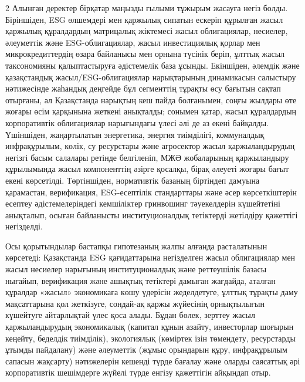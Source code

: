 \begin{multicols}{2}
Алынған деректер бірқатар маңызды ғылыми тұжырым жасауға негіз болды.
Біріншіден, ESG өлшемдері мен қаржылық сипатын ескеріп құрылған жасыл
қаржылық құралдардың матрицалық жіктемесі жасыл облигациялар, несиелер,
әлеуметтік және ESG-облигациялар, жасыл инвестициялық қорлар мен
микрокредиттердің өзара байланысы мен орнына түсінік беріп, ұлттық жасыл
таксономияны қалыптастыруға әдістемелік база ұсынды. Екіншіден, әлемдік
және қазақстандық жасыл/ESG-облигациялар нарықтарының динамикасын
салыстыру нәтижесінде жаһандық деңгейде бұл сегменттің тұрақты өсу
бағытын сақтап отырғаны, ал Қазақстанда нарықтың кеш пайда болғанымен,
соңғы жылдары өте жоғары өсім қарқынына жеткені анықталды; сонымен
қатар, жасыл құралдардың корпоративтік облигациялар нарығындағы үлесі
әлі де аз екені байқалды. Үшіншіден, жаңартылатын энергетика, энергия
тиімділігі, коммуналдық инфрақұрылым, көлік, су ресурстары және
агросектор жасыл қаржыландырудың негізгі басым салалары ретінде
белгіленіп, МЖӘ жобаларының қаржыландыру құрылымында жасыл компоненттің
әзірге қосалқы, бірақ әлеуеті жоғары бағыт екені көрсетілді.
Төртіншіден, нормативтік базаның біртіндеп дамуына қарамастан,
верификация, ESG-есептілік стандарттары және әсер көрсеткіштерін есептеу
әдістемелеріндегі кемшіліктер гринвошинг тәуекелдерін күшейтетіні
анықталып, осыған байланысты институционалдық тетіктерді жетілдіру
қажеттігі негізделді.

Осы қорытындылар бастапқы гипотезаның жалпы алғанда расталатынын
көрсетеді: Қазақстанда ESG қағидаттарына негізделген жасыл облигациялар
мен жасыл несиелер нарығының институционалдық және реттеушілік базасы
нығайып, верификация және ашықтық тетіктері дамыған жағдайда, аталған
құралдар «жасыл» экономикаға көшу үдерісін жеделдетуге, ұлттық тұрақты
даму мақсаттарына қол жеткізуге, сондай-ақ қаржы жүйесінің орнықтылығын
күшейтуге айтарлықтай үлес қоса алады. Бұдан бөлек, зерттеу жасыл
қаржыландырудың экономикалық (капитал құнын азайту, инвесторлар шоғырын
кеңейту, беделдік тиімділік), экологиялық (көміртек ізін төмендету,
ресурстарды ұтымды пайдалану) және әлеуметтік (жұмыс орындарын құру,
инфрақұрылым сапасын жақсарту) нәтижелерін кешенді түрде бағалау және
оларды саясаттық әрі корпоративтік шешімдерге жүйелі түрде енгізу
қажеттігін айқындап отыр.


\end{multicols}
